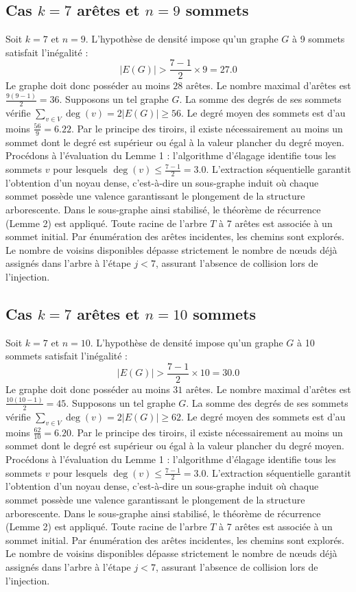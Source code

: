\documentclass[12pt,a4paper]{article}
\begin{document}
\subsection{Cas $k = 7$ arêtes et $n = 9$ sommets}
Soit $k = 7$ et $n = 9$. L'hypothèse de densité impose qu'un graphe $G$ à 9 sommets satisfait l'inégalité :
$$ |E(G)| > \frac{7-1}{2} \times 9 = 27.0 $$
Le graphe doit donc posséder au moins $28$ arêtes. Le nombre maximal d'arêtes est $\frac{9(9-1)}{2} = 36$.
Supposons un tel graphe $G$. La somme des degrés de ses sommets vérifie $\sum_{v \in V} \deg(v) = 2|E(G)| \geq 56$.
Le degré moyen des sommets est d'au moins $\frac{56}{9} = 6.22$.
Par le principe des tiroirs, il existe nécessairement au moins un sommet dont le degré est supérieur ou égal à la valeur plancher du degré moyen.
Procédons à l'évaluation du Lemme 1 : l'algorithme d'élagage identifie tous les sommets $v$ pour lesquels $\deg(v) \leq \frac{7-1}{2} = 3.0$.
L'extraction séquentielle garantit l'obtention d'un noyau dense, c'est-à-dire un sous-graphe induit où chaque sommet possède une valence garantissant le plongement de la structure arborescente.
Dans le sous-graphe ainsi stabilisé, le théorème de récurrence (Lemme 2) est appliqué. Toute racine de l'arbre $T$ à 7 arêtes est associée à un sommet initial. Par énumération des arêtes incidentes, les chemins sont explorés. Le nombre de voisins disponibles dépasse strictement le nombre de nœuds déjà assignés dans l'arbre à l'étape $j < 7$, assurant l'absence de collision lors de l'injection.

\subsection{Cas $k = 7$ arêtes et $n = 10$ sommets}
Soit $k = 7$ et $n = 10$. L'hypothèse de densité impose qu'un graphe $G$ à 10 sommets satisfait l'inégalité :
$$ |E(G)| > \frac{7-1}{2} \times 10 = 30.0 $$
Le graphe doit donc posséder au moins $31$ arêtes. Le nombre maximal d'arêtes est $\frac{10(10-1)}{2} = 45$.
Supposons un tel graphe $G$. La somme des degrés de ses sommets vérifie $\sum_{v \in V} \deg(v) = 2|E(G)| \geq 62$.
Le degré moyen des sommets est d'au moins $\frac{62}{10} = 6.20$.
Par le principe des tiroirs, il existe nécessairement au moins un sommet dont le degré est supérieur ou égal à la valeur plancher du degré moyen.
Procédons à l'évaluation du Lemme 1 : l'algorithme d'élagage identifie tous les sommets $v$ pour lesquels $\deg(v) \leq \frac{7-1}{2} = 3.0$.
L'extraction séquentielle garantit l'obtention d'un noyau dense, c'est-à-dire un sous-graphe induit où chaque sommet possède une valence garantissant le plongement de la structure arborescente.
Dans le sous-graphe ainsi stabilisé, le théorème de récurrence (Lemme 2) est appliqué. Toute racine de l'arbre $T$ à 7 arêtes est associée à un sommet initial. Par énumération des arêtes incidentes, les chemins sont explorés. Le nombre de voisins disponibles dépasse strictement le nombre de nœuds déjà assignés dans l'arbre à l'étape $j < 7$, assurant l'absence de collision lors de l'injection.
\end{document}
